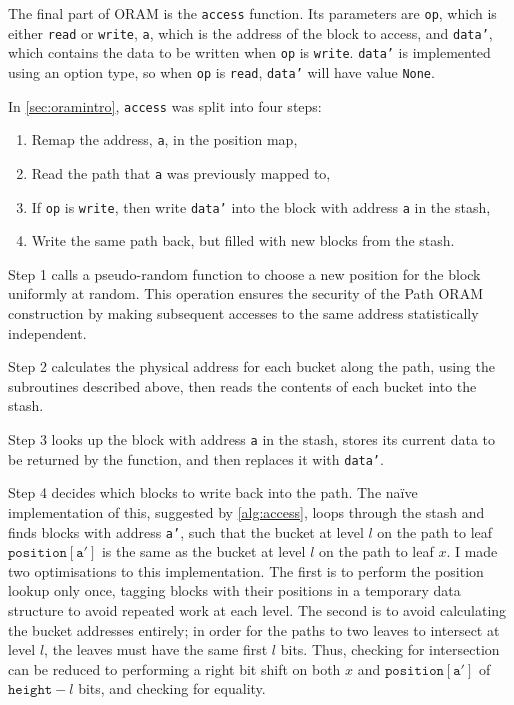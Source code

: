 \documentclass[12pt,a4paper,twoside,openright]{report}
\begin{document}
The final part of ORAM is the \texttt{access} function. Its parameters are \texttt{op}, which is either \texttt{read} or \texttt{write}, \texttt{a}, which is the address of the block to access, and \texttt{data'}, which contains the data to be written when \texttt{op} is \texttt{write}. \texttt{data'} is implemented using an option type, so when \texttt{op} is \texttt{read}, \texttt{data'} will have value \texttt{None}.

In \cref{sec:oramintro}, \texttt{access} was split into four steps:
\begin{enumerate}
    \item Remap the address, \texttt{a}, in the position map,
    \item Read the path that \texttt{a} was previously mapped to,
    \item If \texttt{op} is \texttt{write}, then write \texttt{data'} into the block with address \texttt{a} in the stash,
    \item Write the same path back, but filled with new blocks from the stash.
\end{enumerate}

Step 1 calls a pseudo-random function to choose a new position for the block uniformly at random. This operation ensures the security of the Path ORAM construction by making subsequent accesses to the same address statistically independent.

Step 2 calculates the physical address for each bucket along the path, using the subroutines described above, then reads the contents of each bucket into the stash.

Step 3 looks up the block with address \texttt{a} in the stash, stores its current data to be returned by the function, and then replaces it with \texttt{data'}.

Step 4 decides which blocks to write back into the path. The na\"ive implementation of this, suggested by \cref{alg:access}, loops through the stash and finds blocks with address \texttt{a'}, such that the bucket at level $l$ on the path to leaf $\mathtt{position[a']}$ is the same as the bucket at level $l$ on the path to leaf $x$. I made two optimisations to this implementation. The first is to perform the position lookup only once, tagging blocks with their positions in a temporary data structure to avoid repeated work at each level. The second is to avoid calculating the bucket addresses entirely; in order for the paths to two leaves to intersect at level $l$, the leaves must have the same first $l$ bits. Thus, checking for intersection can be reduced to performing a right bit shift on both $x$ and $\mathtt{position[a']}$ of $\mathtt{height} - l$ bits, and checking for equality.
\end{document}
